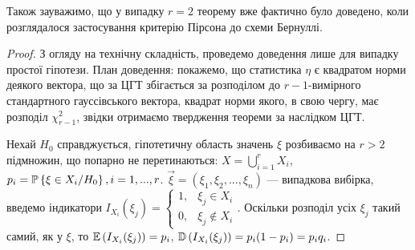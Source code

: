 Також зауважимо, що у випадку $r=2$ теорему вже фактично було доведено, коли розглядалося застосування критерію Пірсона до схеми Бернуллі.
\begin{proof}
    З огляду на технічну складність, проведемо доведення лише для випадку простої гіпотези. 
    План доведення: покажемо, що статистика $\eta$ є квадратом норми деякого вектора, що за ЦГТ збігається за розподілом до $r-1$-вимірного
    стандартного гауссівського вектора, квадрат норми якого, в свою чергу, має розподіл $\chi^2_{r-1}$, звідки отримаємо твердження теореми за наслідком ЦГТ.
    
    Нехай $H_0$ справджується, гіпотетичну область значень $\xi$ розбиваємо на $r>2$
    підмножин, що попарно не перетинаються: $X = \bigcup\limits_{i=1}^r X_i$, $p_i = \P\left\{\xi \in X_i / H_0 \right\}, i=1,...,r$.
    $\vec{\xi} = \left(\xi_1, \xi_2, ..., \xi_n\right)$ --- випадкова вибірка, введемо індикатори 
    $I_{X_i}(\xi_j) = \begin{cases}
        1, & \xi_j \in X_i \\
        0, & \xi_j \notin X_i
    \end{cases}$.
    Оскільки розподіл усіх $\xi_j$ такий самий, як у $\xi$, то $\E\left(I_{X_i}(\xi_j)\right) = p_i$,
    $\D\left(I_{X_i}(\xi_j)\right) = p_i (1-p_i) = p_i q_i$.
    

\end{proof}

